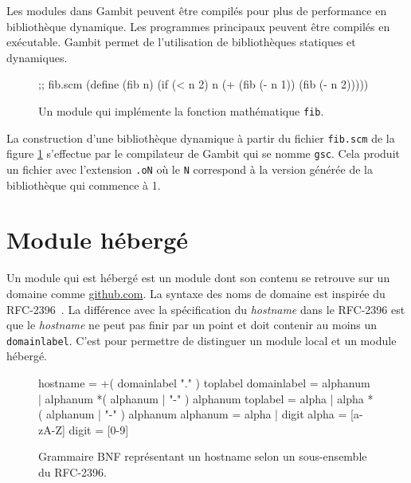 Les modules dans Gambit peuvent être compilés pour plus de performance en
bibliothèque dynamique. Les programmes principaux peuvent être compilés en
exécutable.  Gambit permet de l'utilisation de bibliothèques statiques et
dynamiques.\\

\begin{figure}[ht]
  \centering

  \begin{mplisting}{0.5}
;; fib.scm
(define (fib n)
  (if (< n 2)
      n
      (+ (fib (- n 1))
         (fib (- n 2)))))
\end{mplisting}
  \caption{Un module qui implémente la fonction mathématique \texttt{fib}.}
  \label{fig:basic_fib_module}
\end{figure}

\vspace{-20pt}
La construction d'une bibliothèque dynamique à partir du fichier \texttt{fib.scm}
de la figure \ref{fig:basic_fib_module} s'effectue par le compilateur de Gambit
qui se nomme \texttt{gsc}. Cela produit un fichier avec l'extension \texttt{.oN}
où le \texttt{N} correspond à la version générée de la bibliothèque qui commence à 1.


\section{Module hébergé}

Un module qui est hébergé est un module dont son contenu
se retrouve sur un domaine comme \url{github.com}. La syntaxe
des noms de domaine est inspirée du RFC-2396~\cite{RFC:URI-2396}.
La différence avec la spécification du \textit{hostname} dans le RFC-2396
est que le \textit{hostname} ne peut pas finir par un point et doit contenir
au moins un \verb|domainlabel|. C'est pour permettre de distinguer
un module local et un module hébergé. \\

\begin{figure}[ht]
  \centering
  \lstset{frame=single}
  \begin{mplisting}{0.9}
hostname      = +( domainlabel "." ) toplabel
domainlabel   = alphanum | alphanum *( alphanum | "-" ) alphanum
toplabel      = alpha | alpha *( alphanum | "-" ) alphanum
alphanum      = alpha | digit
alpha         = [a-zA-Z]
digit         = [0-9]
\end{mplisting}
  \caption{Grammaire BNF représentant un hostname selon un sous-ensemble du
  RFC-2396.}
  \label{lst:hostname->grammar}
\end{figure}


